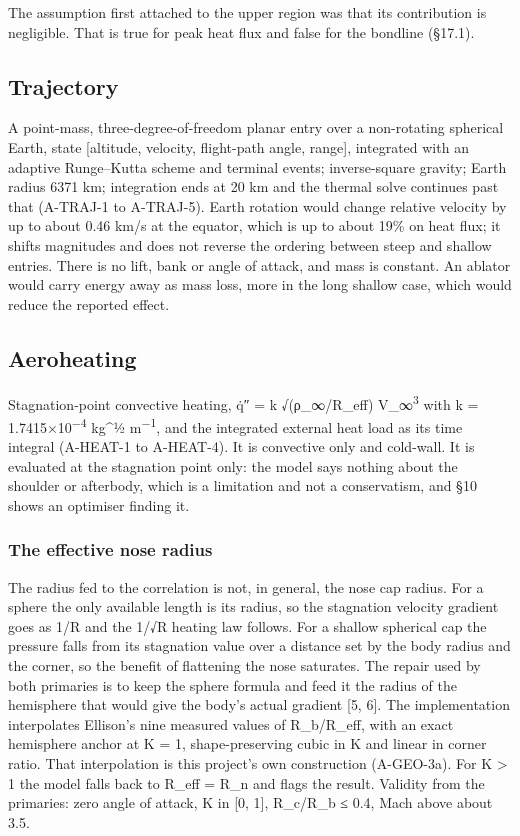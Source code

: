 \documentclass[
  a4paper,
  11pt]{article}
\begin{document}
The assumption first attached to the upper region was that its
contribution is negligible. That is true for peak heat flux and false
for the bondline (§17.1).

\subsection{Trajectory}

A point-mass, three-degree-of-freedom planar entry over a non-rotating
spherical Earth, state {[}altitude, velocity, flight-path angle,
range{]}, integrated with an adaptive Runge--Kutta scheme and terminal
events; inverse-square gravity; Earth radius 6371 km; integration ends
at 20 km and the thermal solve continues past that (A-TRAJ-1 to
A-TRAJ-5). Earth rotation would change relative velocity by up to about
0.46 km/s at the equator, which is up to about 19\% on heat flux; it
shifts magnitudes and does not reverse the ordering between steep and
shallow entries. There is no lift, bank or angle of attack, and mass is
constant. An ablator would carry energy away as mass loss, more in the
long shallow case, which would reduce the reported effect.

\subsection{Aeroheating}

Stagnation-point convective heating, \.{q}{\symfont ″} = k
√(ρ\_∞/R\_eff) V\_∞\textsuperscript{3} with k =
1.7415×10\textsuperscript{−4} kg\^{}½ m\textsuperscript{−1}, and the
integrated external heat load as its time integral (A-HEAT-1 to
A-HEAT-4). It is convective only and cold-wall. It is evaluated at the
stagnation point only: the model says nothing about the shoulder or
afterbody, which is a limitation and not a conservatism, and §10 shows
an optimiser finding it.

\subsubsection{The effective nose
radius}\label{the-effective-nose-radius}

The radius fed to the correlation is not, in general, the nose cap
radius. For a sphere the only available length is its radius, so the
stagnation velocity gradient goes as 1/R and the 1/√R heating law
follows. For a shallow spherical cap the pressure falls from its
stagnation value over a distance set by the body radius and the corner,
so the benefit of flattening the nose saturates. The repair used by both
primaries is to keep the sphere formula and feed it the radius of the
hemisphere that would give the body's actual gradient {[}5, 6{]}. The
implementation interpolates Ellison's nine measured values of
R\_b/R\_eff, with an exact hemisphere anchor at K = 1, shape-preserving
cubic in K and linear in corner ratio. That interpolation is this
project's own construction (A-GEO-3a). For K \textgreater{} 1 the model
falls back to R\_eff = R\_n and flags the result. Validity from the
primaries: zero angle of attack, K in {[}0, 1{]}, R\_c/R\_b ≤ 0.4, Mach
above about 3.5.
\end{document}
